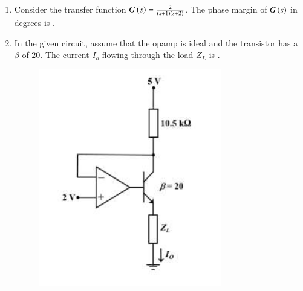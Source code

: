 \documentclass[journal,12pt,onecolumn]{IEEEtran}
\theoremstyle{remark}
\begin{document}
\begin{enumerate}
\begin{enumerate}
\begin{figure}[H]
         \caption*{} 
         \label{fig:q13} 
        \end{figure}
    \end{enumerate}

    \item Consider the transfer function $G\left(s\right)=\frac{2}{\left(s+1\right)\left(s+2\right)}$. The phase margin of $G\left(s\right)$ in degrees is \underline{\hspace{2cm}}.
    
    \hfill{}

    
    \item In the given circuit, assume that the opamp is ideal and the transistor has a $\beta$ of $20$. The current $I_{o}$  flowing through the load $Z_{L}$ is \underline{\hspace{2cm}}.
    \begin{figure}[H]
        \centering
        \includegraphics[width=0.4\columnwidth]{q15.png}
        \caption*{}
        \label{fig:q15}
    \end{figure}
    

\end{enumerate}
\end{document}
